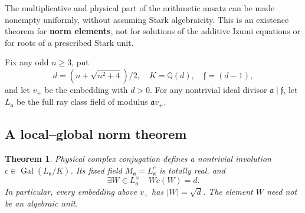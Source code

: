 \documentclass[11pt,reqno]{amsart}
\theoremstyle{plain}
\newtheorem{theorem}{Theorem}[section]
\begin{document}
The multiplicative and physical part of the arithmetic ansatz can be
made nonempty uniformly, without assuming Stark algebraicity. This is
an existence theorem for \textbf{norm elements}, not for solutions of the
additive Izumi equations or for roots of a prescribed Stark unit.

Fix any odd \(n\ge3\), put
\[
 d=(n+\sqrt{n^2+4})/2,\quad K=\mathbb Q(d),\quad
 \mathfrak f=(d-1),
\]
and let \(v_+\) be the embedding with \(d>0\). For any nontrivial
ideal divisor \(\mathfrak a\mid\mathfrak f\), let \(L_{\mathfrak a}\)
be the full ray class field of modulus \(\mathfrak a v_+\).

\subsection{A local--global norm theorem}\label{sec:47.1}

\begin{theorem}
Physical complex conjugation defines a nontrivial
involution \(c\in\operatorname{Gal}(L_{\mathfrak a}/K)\). Its fixed
field \(M_{\mathfrak a}=L_{\mathfrak a}^{c}\) is totally real, and
\begin{equation*}
 \boxed{\exists W\in L_{\mathfrak a}^{\times}\quad
        Wc(W)=d.} \tag{47.1}
\end{equation*}
In particular, every embedding above \(v_+\) has
\(|W|=\sqrt d\). The element \(W\) need not be an algebraic unit.
\end{theorem}
\end{document}
